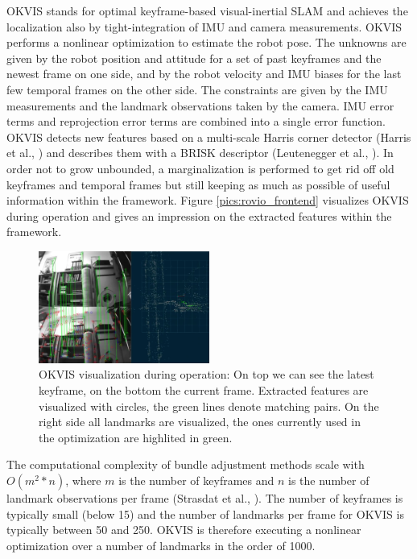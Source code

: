 OKVIS stands for optimal keyframe-based visual-inertial SLAM and achieves the localization also by tight-integration of IMU and camera measurements. OKVIS performs a nonlinear optimization to estimate the robot pose. The unknowns are given by the robot position and attitude for a set of past keyframes and the newest frame on one side, and by the robot velocity and IMU biases for the last few temporal frames on the other side. The constraints are given by the IMU measurements and the landmark observations taken by the camera. IMU error terms and reprojection error terms are combined into a single error function. OKVIS detects new features based on a multi-scale Harris corner detector (Harris et al., \cite{harris1988combined}) and describes them with a BRISK descriptor (Leutenegger et al., \cite{leutenegger2011brisk}). In order not to grow unbounded, a marginalization is performed to get rid off old keyframes and temporal frames but still keeping as much as possible of useful information within the framework. Figure \ref{pics:rovio_frontend} visualizes OKVIS during operation and gives an impression on the extracted features within the framework.

\begin{figure}[h]
   \centering
   \includegraphics[width=0.5\textwidth]{images/okvis_frontend.png}
   \caption{OKVIS visualization during operation: On top we can see the latest keyframe, on the bottom the current frame. Extracted features are visualized with circles, the green lines denote matching pairs. On the right side all landmarks are visualized, the ones currently used in the optimization are highlited in green.}
   \label{pics:okvis_frontend}
\end{figure}

The computational complexity of bundle adjustment methods scale with $O(m^2*n)$, where $m$ is the number of keyframes and $n$ is the number of landmark observations per frame (Strasdat et al., \cite{strasdat2010real}). The number of keyframes is typically small (below 15) and the number of landmarks per frame for OKVIS is typically between 50 and 250. OKVIS is therefore executing a nonlinear optimization over a number of landmarks in the order of 1000. 

